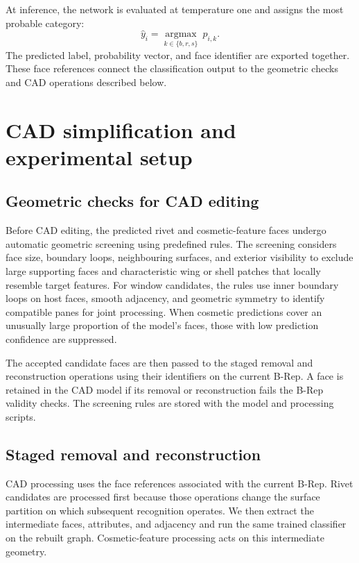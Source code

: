\documentclass[12pt,a4paper]{article}
\begin{document}
At inference, the network is evaluated at temperature one and assigns the most probable category:
\begin{equation}
\hat{y}_i=\underset{k\in\{b,r,s\}}{\operatorname{argmax}}\ p_{i,k}.
\label{eq:categorical_decision}
\end{equation}
The predicted label, probability vector, and face identifier are exported together. These face references connect the classification output to the geometric checks and CAD operations described below.

\section{CAD simplification and experimental setup}\label{sec:processing_pipeline}

\subsection{Geometric checks for CAD editing}\label{sec:risk_filtering}

Before CAD editing, the predicted rivet and cosmetic-feature faces undergo automatic geometric screening using predefined rules. The screening considers face size, boundary loops, neighbouring surfaces, and exterior visibility to exclude large supporting faces and characteristic wing or shell patches that locally resemble target features. For window candidates, the rules use inner boundary loops on host faces, smooth adjacency, and geometric symmetry to identify compatible panes for joint processing. When cosmetic predictions cover an unusually large proportion of the model's faces, those with low prediction confidence are suppressed.

The accepted candidate faces are then passed to the staged removal and reconstruction operations using their identifiers on the current B-Rep. A face is retained in the CAD model if its removal or reconstruction fails the B-Rep validity checks. The screening rules are stored with the model and processing scripts.

\subsection{Staged removal and reconstruction}\label{sec:geometry_protocol}

CAD processing uses the face references associated with the current B-Rep. Rivet candidates are processed first because those operations change the surface partition on which subsequent recognition operates. We then extract the intermediate faces, attributes, and adjacency and run the same trained classifier on the rebuilt graph. Cosmetic-feature processing acts on this intermediate geometry.
\end{document}
